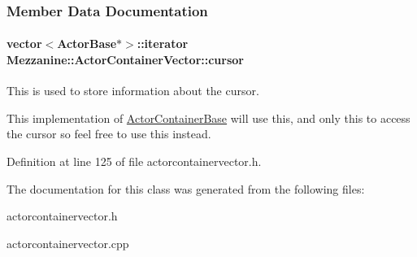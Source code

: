 \subsubsection{Member Data Documentation}
\hypertarget{classMezzanine_1_1ActorContainerVector_ac359dee117cfe4829c656f7599ea9092}{
\paragraph[{cursor}]{\setlength{\rightskip}{0pt plus 5cm}vector$<${\bf ActorBase}$\ast$$>$::iterator {\bf Mezzanine::ActorContainerVector::cursor}}\hfill}
\label{classMezzanine_1_1ActorContainerVector_ac359dee117cfe4829c656f7599ea9092}


This is used to store information about the cursor. 

This implementation of \hyperlink{classMezzanine_1_1ActorContainerBase}{ActorContainerBase} will use this, and only this to access the cursor so feel free to use this instead. 

Definition at line 125 of file actorcontainervector.h.



The documentation for this class was generated from the following files:\begin{DoxyCompactItemize}
\item 
actorcontainervector.h\item 
actorcontainervector.cpp\end{DoxyCompactItemize}
